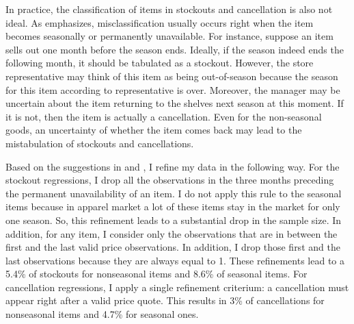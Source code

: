 \documentclass[12pt]{article}
\begin{document}
	
	In practice, the classification of items in stockouts and cancellation is also not ideal. As \citet{bils} emphasizes, misclassification usually occurs right when the item becomes seasonally or permanently unavailable. For instance, suppose an item sells out one month before the season ends. Ideally, if the season indeed ends the following month, it should be tabulated as a stockout. However, the store representative may think of this item as being out-of-season because the season for this item according to representative is over. Moreover,  the manager may be uncertain about the item returning to the shelves next season at this moment. If it is not, then the item is actually a cancellation.  Even for the non-seasonal goods, an uncertainty of whether the item comes back may lead to the mistabulation of stockouts and cancellations.
	
	Based on the suggestions in \cite{bils} and \citet{matsa}, I refine my data in the following way. For the stockout regressions, I drop all the observations in the three months preceding the permanent unavailability of an item. I do not apply this rule to the seasonal items because in apparel market a lot of these items stay in the market for only one season. So, this refinement leads to a substantial drop in the sample size. In addition, for any item, I consider only the observations that are in between the first and the last valid price observations. In addition, I drop those first and the last observations because they are always equal to 1. These refinements lead to a 5.4\% of stockouts for nonseasonal items and 8.6\% of seasonal items. For cancellation regressions, I apply a single refinement criterium: a cancellation must appear right after a valid price quote. This results in 3\% of cancellations for nonseasonal items and 4.7\% for seasonal ones.
\end{document}
